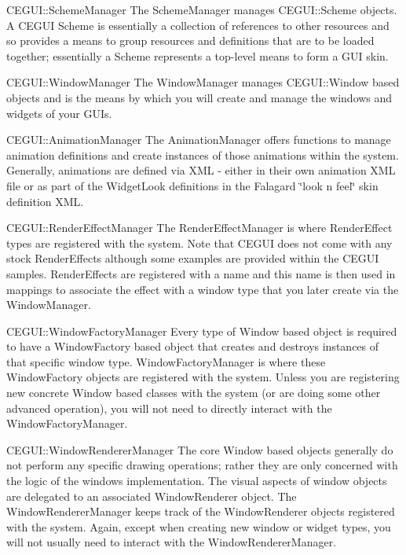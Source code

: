 \begin{DoxyParagraph}{C\+E\+G\+UI\+::Scheme\+Manager}
The Scheme\+Manager manages C\+E\+G\+U\+I\+::\+Scheme objects. A C\+E\+G\+UI Scheme is essentially a collection of references to other resources and so provides a means to group resources and definitions that are to be loaded together; essentially a Scheme represents a top-\/level means to form a G\+UI \textquotesingle{}skin\textquotesingle{}.
\end{DoxyParagraph}
\begin{DoxyParagraph}{C\+E\+G\+UI\+::Window\+Manager}
The Window\+Manager manages C\+E\+G\+U\+I\+::\+Window based objects and is the means by which you will create and manage the windows and widgets of your G\+U\+Is.
\end{DoxyParagraph}
\begin{DoxyParagraph}{C\+E\+G\+UI\+::Animation\+Manager}
The Animation\+Manager offers functions to manage animation definitions and create instances of those animations within the system. Generally, animations are defined via X\+ML -\/ either in their own animation X\+ML file or as part of the Widget\+Look definitions in the Falagard \char`\"{}look n feel\char`\"{} skin definition X\+ML.
\end{DoxyParagraph}
\begin{DoxyParagraph}{C\+E\+G\+UI\+::Render\+Effect\+Manager}
The Render\+Effect\+Manager is where Render\+Effect types are registered with the system. Note that C\+E\+G\+UI does not come with any \textquotesingle{}stock\textquotesingle{} Render\+Effects although some examples are provided within the C\+E\+G\+UI samples. Render\+Effects are registered with a name and this name is then used in mappings to associate the effect with a window type that you later create via the Window\+Manager.
\end{DoxyParagraph}
\begin{DoxyParagraph}{C\+E\+G\+UI\+::Window\+Factory\+Manager}
Every type of Window based object is required to have a Window\+Factory based object that creates and destroys instances of that specific window type. Window\+Factory\+Manager is where these Window\+Factory objects are registered with the system. Unless you are registering new concrete Window based classes with the system (or are doing some other advanced operation), you will not need to directly interact with the Window\+Factory\+Manager.
\end{DoxyParagraph}
\begin{DoxyParagraph}{C\+E\+G\+UI\+::Window\+Renderer\+Manager}
The core Window based objects generally do not perform any specific drawing operations; rather they are only concerned with the logic of the window\textquotesingle{}s implementation. The visual aspects of window objects are delegated to an associated Window\+Renderer object. The Window\+Renderer\+Manager keeps track of the Window\+Renderer objects registered with the system. Again, except when creating new window or widget types, you will not usually need to interact with the Window\+Renderer\+Manager.
\end{DoxyParagraph}
